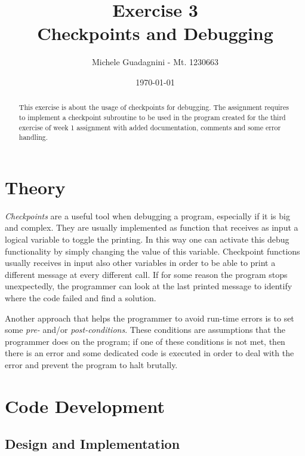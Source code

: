 \documentclass[11pt,a4paper]{article}
\author{Michele Guadagnini - Mt. 1230663}
\title{\textbf{Exercise 3 \\ Checkpoints and Debugging}}
\date{\today}
\begin{document}
	
\maketitle

\vspace{20pt}
\begin{abstract}
	This exercise is about the usage of checkpoints for debugging.
	The assignment requires to implement a checkpoint subroutine to be used in the program created for the third exercise of week 1 assignment with added documentation, comments and some error handling. 
\end{abstract}

\vspace{20pt}
\section{Theory} %

\textit{Checkpoints} are a useful tool when debugging a program, especially if it is big and complex. They are usually implemented as function that receives as input a logical variable to toggle the printing. In this way one can activate this debug functionality by simply changing the value of this variable. Checkpoint functions usually receives in input also other variables in order to be able to print a different message at every different call.
If for some reason the program stops unexpectedly, the programmer can look at the last printed message to identify where the code failed and find a solution.

Another approach that helps the programmer to avoid run-time errors is to set some \textit{pre-} and/or \textit{post-conditions}. 
These conditions are assumptions that the programmer does on the program; if one of these conditions is not met, then there is an error and some dedicated code is executed in order to deal with the error and prevent the program to halt brutally.

\section{Code Development} %

\subsection{Design and Implementation}
\end{document}
